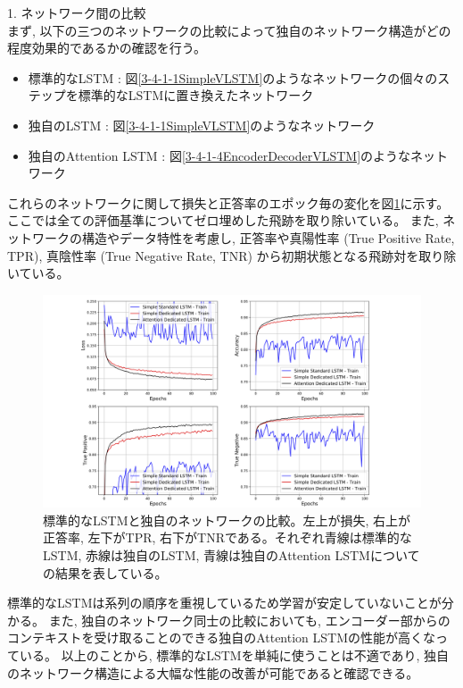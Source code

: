1. ネットワーク間の比較\\

まず, 以下の三つのネットワークの比較によって独自のネットワーク構造がどの程度効果的であるかの確認を行う。

\begin{itemize}
 \item 標準的なLSTM : 図\ref{3-4-1-1SimpleVLSTM}のようなネットワークの個々のステップを標準的なLSTMに置き換えたネットワーク
 \item 独自のLSTM : 図\ref{3-4-1-1SimpleVLSTM}のようなネットワーク
 \item 独自のAttention LSTM : 図\ref{3-4-1-4EncoderDecoderVLSTM}のようなネットワーク
\end{itemize}

これらのネットワークに関して損失と正答率のエポック毎の変化を図\ref{3-4-3-1LSTMvsVLSTM}に示す。
ここでは全ての評価基準についてゼロ埋めした飛跡を取り除いている。
また, ネットワークの構造やデータ特性を考慮し, 正答率や真陽性率 (True Positive Rate, TPR), 真陰性率 (True Negative Rate, TNR) から初期状態となる飛跡対を取り除いている。

\begin{figure}[htbp]
 \centering
 \includegraphics[trim = 100 0 100 0, width=1.0\textwidth, clip]{Figure/3Networks/3-4-3-1LSTMvsVLSTM.png}
 \caption[標準的なLSTMと独自のネットワークの比較]{標準的なLSTMと独自のネットワークの比較。左上が損失, 右上が正答率, 左下がTPR, 右下がTNRである。それぞれ青線は標準的なLSTM, 赤線は独自のLSTM, 青線は独自のAttention LSTMについての結果を表している。}
 \label{3-4-3-1LSTMvsVLSTM}
\end{figure}

標準的なLSTMは系列の順序を重視しているため学習が安定していないことが分かる。
また, 独自のネットワーク同士の比較においても, エンコーダー部からのコンテキストを受け取ることのできる独自のAttention LSTMの性能が高くなっている。
以上のことから, 標準的なLSTMを単純に使うことは不適であり, 独自のネットワーク構造による大幅な性能の改善が可能であると確認できる。\\

